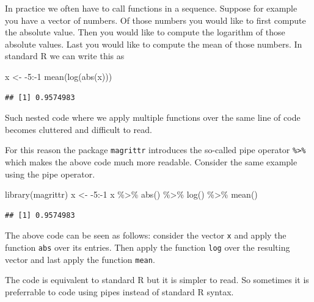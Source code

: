 \documentclass[
]{book}
\newenvironment{Shaded}{\begin{snugshade}}{\end{snugshade}}
\newcommand{\DecValTok}[1]{\textcolor[rgb]{0.00,0.00,0.81}{#1}}
\newcommand{\FunctionTok}[1]{\textcolor[rgb]{0.00,0.00,0.00}{#1}}
\newcommand{\NormalTok}[1]{#1}
\newcommand{\OtherTok}[1]{\textcolor[rgb]{0.56,0.35,0.01}{#1}}
\newcommand{\SpecialCharTok}[1]{\textcolor[rgb]{0.00,0.00,0.00}{#1}}
\theoremstyle{definition}
\theoremstyle{definition}
\theoremstyle{definition}
\theoremstyle{definition}
\theoremstyle{remark}
\begin{document}
In practice we often have to call functions in a sequence. Suppose for example you have a vector of numbers. Of those numbers you would like to first compute the absolute value. Then you would like to compute the logarithm of those absolute values. Last you would like to compute the mean of those numbers. In standard R we can write this as

\begin{Shaded}
\begin{Highlighting}[]
\NormalTok{x }\OtherTok{\textless{}{-}} \SpecialCharTok{{-}}\DecValTok{5}\SpecialCharTok{:{-}}\DecValTok{1}
\FunctionTok{mean}\NormalTok{(}\FunctionTok{log}\NormalTok{(}\FunctionTok{abs}\NormalTok{(x)))}
\end{Highlighting}
\end{Shaded}

\begin{verbatim}
## [1] 0.9574983
\end{verbatim}

Such nested code where we apply multiple functions over the same line of code becomes cluttered and difficult to read.

For this reason the package \texttt{magrittr} introduces the so-called pipe operator \texttt{\%\textgreater{}\%} which makes the above code much more readable. Consider the same example using the pipe operator.

\begin{Shaded}
\begin{Highlighting}[]
\FunctionTok{library}\NormalTok{(magrittr)}
\NormalTok{x }\OtherTok{\textless{}{-}} \SpecialCharTok{{-}}\DecValTok{5}\SpecialCharTok{:{-}}\DecValTok{1}
\NormalTok{x }\SpecialCharTok{\%\textgreater{}\%} \FunctionTok{abs}\NormalTok{() }\SpecialCharTok{\%\textgreater{}\%} \FunctionTok{log}\NormalTok{() }\SpecialCharTok{\%\textgreater{}\%} \FunctionTok{mean}\NormalTok{()}
\end{Highlighting}
\end{Shaded}

\begin{verbatim}
## [1] 0.9574983
\end{verbatim}

The above code can be seen as follows: consider the vector \texttt{x} and apply the function \texttt{abs} over its entries. Then apply the function \texttt{log} over the resulting vector and last apply the function \texttt{mean}.

The code is equivalent to standard R but it is simpler to read. So sometimes it is preferrable to code using pipes instead of standard R syntax.
\end{document}
